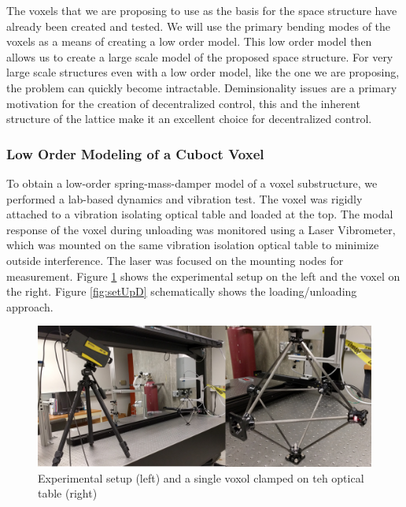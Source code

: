 \documentclass[11pt]{ucthesis}
\begin{document}
The voxels that we are proposing to use as the basis for the space structure have already been created and tested.\cite{jenett2016meso} We will use the primary bending modes of the voxels as a means of creating a low order model. This low order model then allows us to create a large scale model of the proposed space structure. For very large scale structures even with a low order model, like the one we are proposing, the problem can quickly become intractable. Deminsionality issues are a primary motivation for the creation of decentralized control\cite{bakule2008decentralized}, this and the inherent structure of the lattice make it an excellent choice for decentralized control.

\subsubsection{Low Order Modeling of a Cuboct Voxel}
\label{sec:model}
To obtain a low-order spring-mass-damper model of a voxel substructure, we performed a lab-based dynamics and vibration test. The voxel was rigidly attached to a vibration isolating optical table and loaded at the top. The modal response of the voxel during unloading was monitored using a Laser Vibrometer, which was mounted on the same vibration isolation optical table to minimize outside interference. The laser was focused on the mounting nodes for measurement. Figure \ref{fig:setUp} shows the experimental setup on the left and the voxel on the right. Figure \ref{fig:setUpD} schematically shows the loading/unloading approach.

\begin{figure}[h]
\centering
\includegraphics[width=0.75\linewidth]{Figures/experimentalSetup.png}
\caption{Experimental setup (left) and a single voxol clamped on teh optical table (right)}
\label{fig:setUp}
\end{figure}
\end{document}
